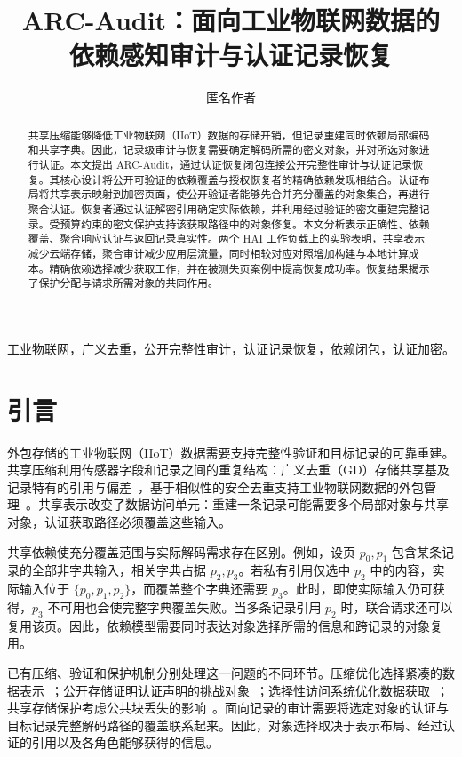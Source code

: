 \documentclass[10pt,journal]{IEEEtran}
\title{ARC-Audit：面向工业物联网数据的\\依赖感知审计与认证记录恢复}
\author{匿名作者}
\begin{document}
\maketitle
\begin{abstract}
共享压缩能够降低工业物联网（IIoT）数据的存储开销，但记录重建同时依赖局部编码和共享字典。因此，记录级审计与恢复需要确定解码所需的密文对象，并对所选对象进行认证。本文提出 ARC-Audit，通过认证恢复闭包连接公开完整性审计与认证记录恢复。其核心设计将公开可验证的依赖覆盖与授权恢复者的精确依赖发现相结合。认证布局将共享表示映射到加密页面，使公开验证者能够先合并充分覆盖的对象集合，再进行聚合认证。恢复者通过认证解密引用确定实际依赖，并利用经过验证的密文重建完整记录。受预算约束的密文保护支持该获取路径中的对象修复。本文分析表示正确性、依赖覆盖、聚合响应认证与返回记录真实性。两个 HAI 工作负载上的实验表明，共享表示减少云端存储，聚合审计减少应用层流量，同时相较对应对照增加构建与本地计算成本。精确依赖选择减少获取工作，并在被测失页案例中提高恢复成功率。恢复结果揭示了保护分配与请求所需对象的共同作用。
\end{abstract}
\begin{IEEEkeywords}
工业物联网，广义去重，公开完整性审计，认证记录恢复，依赖闭包，认证加密。
\end{IEEEkeywords}

\section{引言}\label{sec:introduction}
外包存储的工业物联网（IIoT）数据需要支持完整性验证和目标记录的可靠重建。共享压缩利用传感器字段和记录之间的重复结构：广义去重（GD）存储共享基及记录特有的引用与偏差~\cite{Talasila2019}，基于相似性的安全去重支持工业物联网数据的外包管理~\cite{Gao2024}。共享表示改变了数据访问单元：重建一条记录可能需要多个局部对象与共享对象，认证获取路径必须覆盖这些输入。

共享依赖使充分覆盖范围与实际解码需求存在区别。例如，设页 $p_0,p_1$ 包含某条记录的全部非字典输入，相关字典占据 $p_2,p_3$。若私有引用仅选中 $p_2$ 中的内容，实际输入位于 $\{p_0,p_1,p_2\}$，而覆盖整个字典还需要 $p_3$。此时，即使实际输入仍可获得，$p_3$ 不可用也会使完整字典覆盖失败。当多条记录引用 $p_2$ 时，联合请求还可以复用该页。因此，依赖模型需要同时表达对象选择所需的信息和跨记录的对象复用。

已有压缩、验证和保护机制分别处理这一问题的不同环节。压缩优化选择紧凑的数据表示~\cite{Hurst2024GreedyGD}；公开存储证明认证声明的挑战对象~\cite{ShachamWaters2013}；选择性访问系统优化数据获取~\cite{Taurone2024TREAT}；共享存储保护考虑公共块丢失的影响~\cite{Bhagwat2006Reliability}。面向记录的审计需要将选定对象的认证与目标记录完整解码路径的覆盖联系起来。因此，对象选择取决于表示布局、经过认证的引用以及各角色能够获得的信息。
\end{document}
